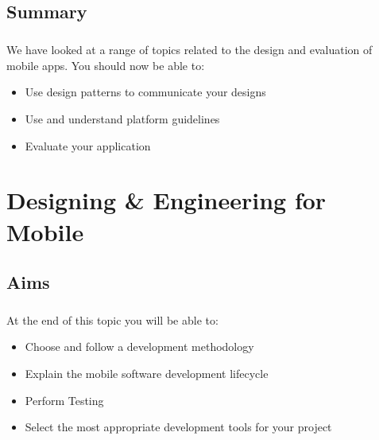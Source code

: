 \documentclass[12pt, a4paper, twoside]{book}
\begin{document}
\section{Summary}
\paragraph{} We have looked at a range of topics related to the design and evaluation of mobile apps. You should now be able to:

\begin{itemize}
\item Use design patterns to communicate your designs
\item Use and understand platform guidelines
\item Evaluate your application
\end{itemize}





\chapter{Designing \& Engineering for Mobile}

\section{Aims}
\paragraph{} At the end of this topic you will be able to:

\begin{itemize}
\item Choose and follow a development methodology
\item Explain the mobile software development lifecycle
\item Perform Testing
\item Select the most appropriate development tools for your project
\end{itemize}
\end{document}
